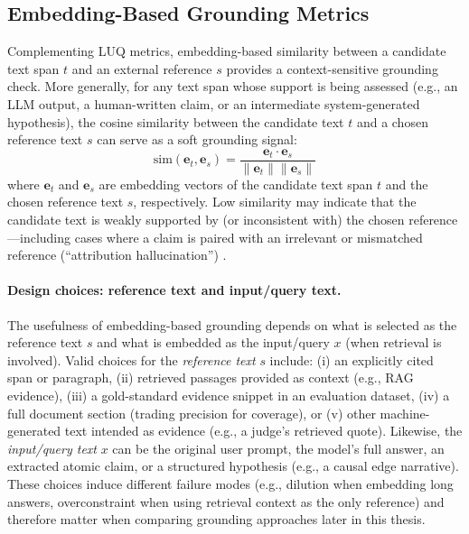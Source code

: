 
\subsection{Embedding-Based Grounding Metrics}
\label{sec:lit_embedding_grounding}

Complementing LUQ metrics, embedding-based similarity between a candidate text span $t$ and an external reference $s$ provides a context-sensitive grounding check. More generally, for any text span whose support is being assessed (e.g., an LLM output, a human-written claim, or an intermediate system-generated hypothesis), the cosine similarity between the candidate text $t$ and a chosen reference text $s$ can serve as a soft grounding signal:
\begin{equation}
\text{sim}(\mathbf{e}_{t}, \mathbf{e}_{s}) = \frac{\mathbf{e}_{t} \cdot \mathbf{e}_{s}}{\|\mathbf{e}_{t}\| \|\mathbf{e}_{s}\|}
\end{equation}
where $\mathbf{e}_{t}$ and $\mathbf{e}_{s}$ are embedding vectors of the candidate text span $t$ and the chosen reference text $s$, respectively. Low similarity may indicate that the candidate text is weakly supported by (or inconsistent with) the chosen reference---including cases where a claim is paired with an irrelevant or mismatched reference (``attribution hallucination'') \citep{tonmoy2024comprehensive,batista2025safeimprovingllmsystems}.

\paragraph{Design choices: reference text and input/query text.} The usefulness of embedding-based grounding depends on what is selected as the reference text $s$ and what is embedded as the input/query $x$ (when retrieval is involved). Valid choices for the \emph{reference text} $s$ include: (i) an explicitly cited span or paragraph, (ii) retrieved passages provided as context (e.g., RAG evidence), (iii) a gold-standard evidence snippet in an evaluation dataset, (iv) a full document section (trading precision for coverage), or (v) other machine-generated text intended as evidence (e.g., a judge's retrieved quote). Likewise, the \emph{input/query text} $x$ can be the original user prompt, the model's full answer, an extracted atomic claim, or a structured hypothesis (e.g., a causal edge narrative). These choices induce different failure modes (e.g., dilution when embedding long answers, overconstraint when using retrieval context as the only reference) and therefore matter when comparing grounding approaches later in this thesis.

